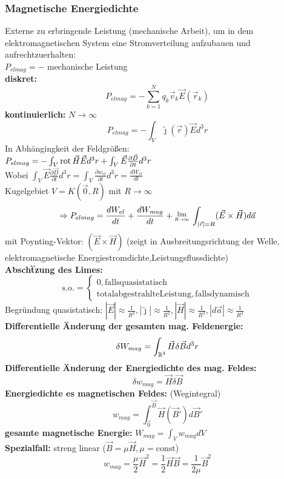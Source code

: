 \documentclass[english]{latex4ei/latex4ei_sheet}
\begin{document}
\subsubsection{Magnetische Energiedichte}
Externe zu erbringende Leistung (mechanische Arbeit), um in dem elektromagnetischen System eine Stromverteilung aufzubauen und aufrechtzuerhalten:\\
$P_{elmag}=-$ mechanische Leistung\\
\textbf{diskret:} \[P_{elmag}=-\sum_{k=1}^N q_k \vec{v}_k \vec{E}(\vec{r}_k)\]
\textbf{kontinuierlich:} $N \to \infty$
\[P_{elmag}=-\int_V \tilde{\jmath}(\vec{r})\vec{E}d^3 r\]
In Abh\"angingkeit der Feldgr\"o\ss{}en:\\
$P_{elmag}=-\int_V \operatorname{rot}{\vec{H}} \vec{E} d^3 r + \int_V \vec{E} \frac{\partial \vec{D}}{\partial t} d^3 r$\\
Wobei $\int_V \vec{E} \frac{\partial \vec{D}}{\partial t} d^3 r=\int_V \frac{\partial w_{el} }{\partial t} d^3 r=\frac{dW_{el}}{d t}$\\
Kugelgebiet $V=K(\vec{0},R)$ mit $R \to \infty$
\[\Rightarrow P_{elmag}=\frac{d W_{el}}{d t}+\frac{dW_{mag}}{d t}+\Lim{R \to \infty} \int_{|\vec{r}|=R} (\vec{E} \times \vec{H}) d \vec{a}\]
mit Poynting-Vektor: $(\vec{E} \times \vec{H})$ (zeigt in Ausbreitungsrichtung der Welle, elektromagnetische Energiestromdichte,Leistungsflussdichte)\\
\textbf{Absch\"tzung des Limes:}\\
\[\mathrm{s.o.}=\begin{cases} 0 , \mathrm{falls quasistatisch} \\ \mathrm{total abgestrahlte Leistung , falls dynamisch} \end{cases}\]
Begr\"undung quasistatisch: $|\vec{E}|\approx \frac{1}{R^2},|\tilde{\jmath}|\approx \frac{1}{R^2},|\vec{H}|\approx \frac{1}{R^3},|d\vec{a}|\approx \frac{1}{R^2}$\\
\textbf{Differentielle \"Anderung der gesamten mag. Feldenergie:}
\[\delta W_{mag}=\int_{\operatorname{\mathbb R}^3} \vec{H} \delta \vec{B} d^3 r\]
\textbf{Differentielle \"Anderung der Energiedichte des mag. Feldes:}
\[\delta w_{mag}=\vec{H} \delta \vec{B}\]
\textbf{Energiedichte es magnetischen Feldes:} (Wegintegral)
\[w_{mag}=\int_{\vec{0}}^{\vec{B}} \vec{H}(\vec{B}') d \vec{B}'\]
\textbf{gesamte magnetische Energie:} $W_{mag}=\int_V w_{mag} d V$\\
\textbf{Spezialfall:} streng linear ($\vec{B}=\mu \vec{H},\mu=\mathrm{const}$)
\[w_{mag}=\frac{\mu}{2}\vec{H}^2=\frac{1}{2} \vec{H} \vec{B}=\frac{1}{2 \mu} \vec{B}^2\]
\end{document}

